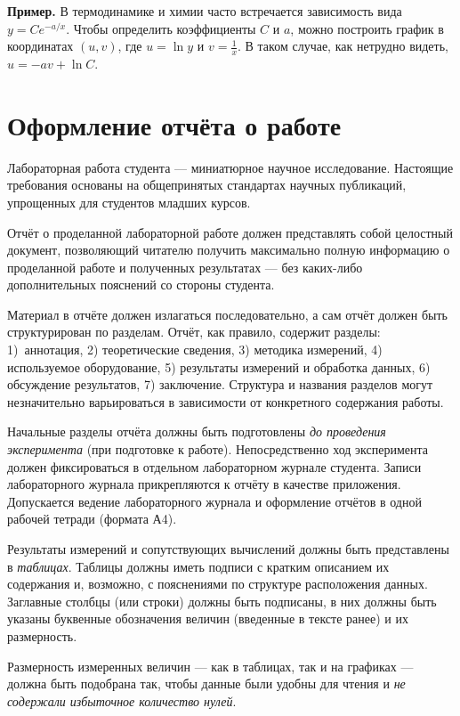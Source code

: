 \textbf{\footnotesize{}Пример.}{\footnotesize{} В термодинамике и
химии часто встречается зависимость вида $y=Ce^{-a/x}$. Чтобы определить
коэффициенты $C$ и $a$, можно построить график в координатах $(u,v)$,
где $u=\ln y$ и $v=\frac{1}{x}$. В таком случае, как нетрудно видеть,
$u=-av+\ln C$.}{\footnotesize\par}


\section{Оформление отчёта о работе}

Лабораторная работа студента --- миниатюрное научное исследование.
Настоящие требования основаны на общепринятых стандартах научных публикаций,
упрощенных для студентов младших курсов.

Отчёт о проделанной лабораторной работе должен представлять собой
целостный документ, позволяющий читателю получить максимально полную
информацию о проделанной работе и полученных результатах ---
без каких-либо дополнительных пояснений со стороны студента.

Материал в отчёте должен излагаться последовательно, а сам отчёт должен
быть структурирован по разделам. Отчёт, как правило, содержит разделы:
1) аннотация, 2) теоретические сведения, 3) методика измерений, 4)
используемое оборудование, 5) результаты измерений и обработка данных,
6) обсуждение результатов, 7) заключение. Структура и названия разделов
могут незначительно варьироваться в зависимости от конкретного содержания
работы.

Начальные разделы отчёта должны быть подготовлены \emph{до проведения
эксперимента} (при подготовке к работе). Непосредственно ход эксперимента
должен фиксироваться в отдельном лабораторном журнале студента. Записи
лабораторного журнала прикрепляются к отчёту в качестве приложения.
Допускается ведение лабораторного журнала и оформление отчётов в одной
рабочей тетради (формата А4).

Результаты измерений и сопутствующих вычислений должны быть представлены
в \emph{таблицах}. Таблицы должны иметь подписи с кратким описанием
их содержания и, возможно, с пояснениями по структуре расположения
данных. Заглавные столбцы (или строки) должны быть подписаны, в них
должны быть указаны буквенные обозначения величин (введенные в тексте
ранее) и их размерность. 

Размерность измеренных величин --- как в таблицах, так и
на графиках --- должна быть подобрана так, чтобы данные
были удобны для чтения и \emph{не содержали избыточное количество
нулей}.


